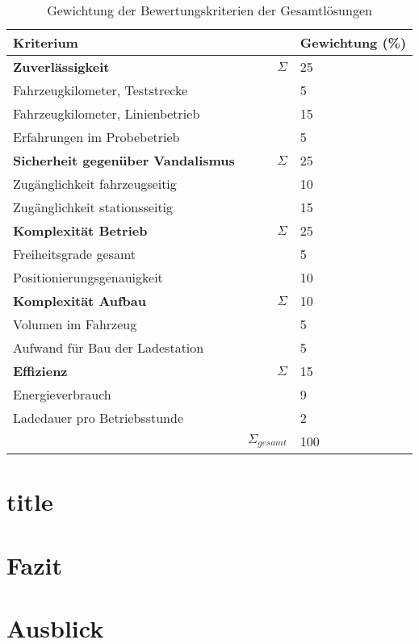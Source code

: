 \begin{table}
	\centering
	\begin{tabularx}{\linewidth}{Xrl}
		\toprule
		Kriterium                        &                   & Gewichtung (\%) \\ \midrule
		\textbf{Zuverlässigkeit}                   & $\Sigma$          & 25                    \\
		Fahrzeugkilometer, Teststrecke   &                   & 5                     \\
		Fahrzeugkilometer, Linienbetrieb &                   & 15                    \\
		Erfahrungen im Probebetrieb      &                   & 5                     \\ \midrule
		\textbf{Sicherheit gegenüber Vandalismus}              & $\Sigma$          & 25                    \\
		Zugänglichkeit fahrzeugseitig    &                   & 10                    \\
		Zugänglichkeit stationsseitig    &                   & 15                    \\ \midrule
		\textbf{Komplexität Betrieb}     & $\Sigma$          & 25                    \\
		Freiheitsgrade gesamt            &                   & 5                     \\
		Positionierungsgenauigkeit       &                   & 10                    \\ \midrule
		\textbf{Komplexität Aufbau}      & $\Sigma$          & 10                    \\
		Volumen im Fahrzeug              &                   & 5                     \\
		Aufwand für Bau der Ladestation  &                   & 5                     \\ \midrule
		\textbf{Effizienz}               & $\Sigma$          & 15                    \\
		Energieverbrauch                 &                   & 9                     \\
		Ladedauer pro Betriebsstunde     &                   & 2                     \\ \bottomrule
		                                 & $\Sigma_{gesamt}$ & 100
	\end{tabularx}
	\label{tab_bewertungskriterien}
	\caption{Gewichtung der Bewertungskriterien der Gesamtlösungen}
\end{table} 

\section{title}





\section{Fazit}
\section{Ausblick}